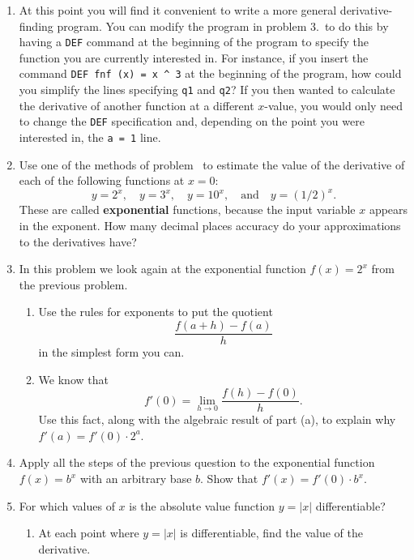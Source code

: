 \begin{enumerate}
\item At this point you will find it convenient to write a more general
derivative-finding program.  You can modify the program in problem
3.\ to do this by having a {\tt DEF} command at the beginning of the
program to specify the function you are currently interested in.  For
instance, if you insert the command {\tt DEF fnf (x) = \verb+x ^ 3+}
at the beginning of the program, how could you simplify the lines
specifying {\tt q1} and {\tt q2}?  If you then wanted to calculate the
derivative of another function at a different $x$-value, you would
only need to change the {\tt DEF} specification and, depending on the
point you were interested in, the {\tt a = 1} line.


\item Use one of the methods of problem \thederivexercise\ to estimate
the value of the derivative of each of the following functions at
$x=0$:
\[
y = 2^x, \quad y = 3^x, \quad y =10^x, \quad 
		\mbox{and} \quad y =(1/2)^x.   
\]
These are called {\bf exponential} functions, because the input
variable $x$ appears in the exponent.  How many decimal places
accuracy do your approximations to the derivatives have?



\item In this problem we look again at the exponential function
$f(x)=2^x$ from the previous problem.

  \begin{enumerate}
  \item Use the rules for exponents to put the quotient
\[
\frac{f(a+ h) - f(a)}{h}
\]
in the simplest form you can.

  \item We know that
\[
f'(0) = \lim_{h \rightarrow 0} \frac{f(h) - f(0)}{h}.
\]
Use this fact, along with the algebraic result of part (a), to 
explain why $f'(a)=f'(0)\cdot2^a$.  



\end{enumerate}
\item Apply all the steps of the previous question to the exponential
function $f(x) = b^x$ with an arbitrary base $b$.  Show that $f'(x) =
f'(0) \cdot b^x$.



\item For which values of $x$ is the absolute value function $y = |x|$
differentiable?

  \begin{enumerate}
  \item At each point where $y = |x|$ is differentiable, find the value
of the derivative.


\end{enumerate}
\end{enumerate}
